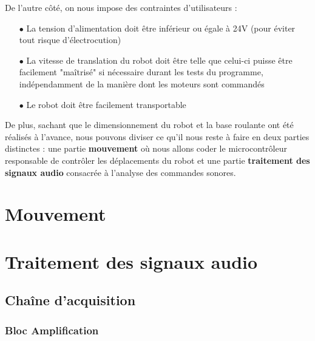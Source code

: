 \documentclass[12pt,a4paper]{ULBReport} %
\begin{document}
De l'autre côté, on nous impose des contraintes d'utilisateurs :

\begin{enumerate}
    \item[$\bullet$] La tension d'alimentation doit être inférieur ou égale à 24V (pour éviter tout risque d'électrocution)
    \item[$\bullet$] La vitesse de translation du robot doit être telle que celui-ci puisse être facilement "maîtrisé" si nécessaire durant les tests du programme, indépendamment de la manière dont les moteurs sont commandés
    \item[$\bullet$] Le robot doit être facilement transportable
\end{enumerate}

De plus, sachant que le dimensionnement du robot et la base roulante ont été réalisés à l'avance, nous pouvons diviser ce qu'il nous reste à faire en deux parties distinctes : une partie \textbf{mouvement} où nous allons coder le microcontrôleur responsable de contrôler les déplacements du robot et une partie \textbf{traitement des signaux audio} consacrée à l'analyse des commandes sonores.  

\chapter{Mouvement}



\chapter{Traitement des signaux audio}



\section{Chaîne d'acquisition}




\subsection{Bloc Amplification}




\end{document}
